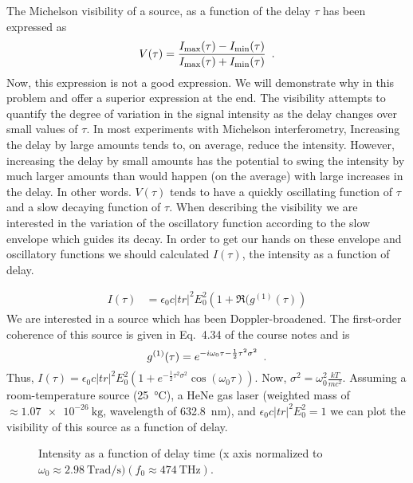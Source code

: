 \begin{homeworkProblem}
    The Michelson visibility of a source, as a function of the delay $ \tau $
    has been expressed as
    \[
        V(\tau) =
        \frac{I_{\textrm{max}}(\tau) -
        I_{\textrm{min}}(\tau)}{I_{\textrm{max}}(\tau) + I_{\textrm{min}}(\tau)}
        \enskip.
    \]
    Now, this expression is not a good expression. We will demonstrate why in
    this problem and offer a superior expression at the end. The visibility
    attempts to quantify the degree of variation in the signal intensity as the
    delay changes over small values of $ \tau $. In most experiments with
    Michelson interferometry, Increasing the delay by large amounts tends to, on
    average, reduce the intensity. However, increasing the delay by small
    amounts has the potential to swing the intensity by much larger amounts than
    would happen (on the average) with large increases in the delay. In other
    words. $ V(\tau) $ tends to have a quickly oscillating function of $ \tau $
    and a slow decaying function of $ \tau $. When describing the visibility we
    are interested in the variation of the oscillatory function according to the
    slow envelope which guides its decay. In order to get our hands on these
    envelope and oscillatory functions we should calculated $ I(\tau) $, the
    intensity as a function of delay.

    \begin{align}
        I(\tau) &= \epsilon_{0} c |t r|^2 E_{0}^{2} \left( 1 + \Re(g^{(1)}(\tau) \right)
    \end{align}
    We are interested in a source which has been Doppler-broadened. The
    first-order coherence of this source is given in Eq.~4.34 of the course
    notes and is
    \[
        g^{(1)}(\tau) = e^{-i \omega_{0} \tau - \frac{1}{2}\tau^{2} \sigma^{2}}
        \enskip.
    \]
    Thus, $ I(\tau) = \epsilon_{0} c |t r|^2 E_{0}^{2} \left( 1 +
    e^{-\frac{1}{2}\tau^2 \sigma^2}\cos(\omega_{0}\tau) \right) $. Now, $
    \sigma^{2} = \omega_{0}^{2} \frac{k T}{m c^2} $. Assuming a room-temperature
    source (\SI{25}{\celsius}), a HeNe gas laser (weighted mass of $ \approx
    \SI{1.07e-26}{\kilo\gram} $, wavelength of \SI{632.8}{\nano\meter}), and $
    \epsilon_{0} c |tr|^2 E_{0}^2 = 1 $ we can plot the visibility of this
    source as a function of delay.

    \begin{figure}[ht]
        \centering
        
        \caption{Intensity as a function of delay time (x axis normalized to $
            \omega_0 \approx \SI{2.98}{\tera\radian\per\second}) (f_0 \approx
        \SI{474}{\tera\hertz})$.}
        \label{fig:Figure1a}
    \end{figure}


\end{homeworkProblem}
